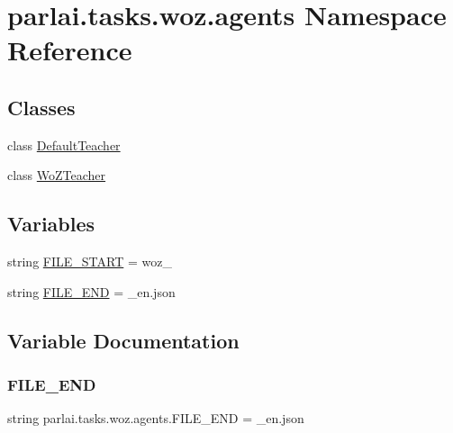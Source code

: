 \hypertarget{namespaceparlai_1_1tasks_1_1woz_1_1agents}{}\section{parlai.\+tasks.\+woz.\+agents Namespace Reference}
\label{namespaceparlai_1_1tasks_1_1woz_1_1agents}
\subsection*{Classes}
\begin{DoxyCompactItemize}
\item 
class \hyperlink{classparlai_1_1tasks_1_1woz_1_1agents_1_1DefaultTeacher}{Default\+Teacher}
\item 
class \hyperlink{classparlai_1_1tasks_1_1woz_1_1agents_1_1WoZTeacher}{Wo\+Z\+Teacher}
\end{DoxyCompactItemize}
\subsection*{Variables}
\begin{DoxyCompactItemize}
\item 
string \hyperlink{namespaceparlai_1_1tasks_1_1woz_1_1agents_a4b99fd566cc1c5d06f87a31cb8cc41c1}{F\+I\+L\+E\+\_\+\+S\+T\+A\+RT} = \textquotesingle{}woz\+\_\+\textquotesingle{}
\item 
string \hyperlink{namespaceparlai_1_1tasks_1_1woz_1_1agents_ab9b76f5208e89ebd21a2b8fb2122910f}{F\+I\+L\+E\+\_\+\+E\+ND} = \textquotesingle{}\+\_\+en.\+json\textquotesingle{}
\end{DoxyCompactItemize}


\subsection{Variable Documentation}
\mbox{\label{namespaceparlai_1_1tasks_1_1woz_1_1agents_ab9b76f5208e89ebd21a2b8fb2122910f}} 
\subsubsection{\texorpdfstring{F\+I\+L\+E\+\_\+\+E\+ND}{FILE\_END}}
{\footnotesize\ttfamily string parlai.\+tasks.\+woz.\+agents.\+F\+I\+L\+E\+\_\+\+E\+ND = \textquotesingle{}\+\_\+en.\+json\textquotesingle{}}

